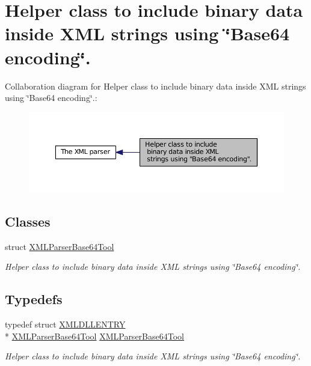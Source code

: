 \hypertarget{group__XMLParserBase64Tool}{\section{Helper class to include binary data inside X\-M\-L strings using \char`\"{}\-Base64 encoding\char`\"{}.}
\label{group__XMLParserBase64Tool}
}
Collaboration diagram for Helper class to include binary data inside X\-M\-L strings using \char`\"{}\-Base64 encoding\char`\"{}.\-:
\nopagebreak
\begin{figure}[H]
\begin{center}
\leavevmode
\includegraphics[width=350pt]{group__XMLParserBase64Tool}
\end{center}
\end{figure}
\subsection*{Classes}
\begin{DoxyCompactItemize}
\item 
struct \hyperlink{structXMLParserBase64Tool}{X\-M\-L\-Parser\-Base64\-Tool}
\begin{DoxyCompactList}\small\item\em Helper class to include binary data inside X\-M\-L strings using \char`\"{}\-Base64 encoding\char`\"{}. \end{DoxyCompactList}\end{DoxyCompactItemize}
\subsection*{Typedefs}
\begin{DoxyCompactItemize}
\item 
typedef struct \hyperlink{xmlParser_8h_a990c86ec1cdbf675604a1a321d852063}{X\-M\-L\-D\-L\-L\-E\-N\-T\-R\-Y} \\*
\hyperlink{structXMLParserBase64Tool}{X\-M\-L\-Parser\-Base64\-Tool} \hyperlink{group__XMLParserBase64Tool_ga90d0646ff4a054f9d8ea0d29fb86f3a9}{X\-M\-L\-Parser\-Base64\-Tool}
\begin{DoxyCompactList}\small\item\em Helper class to include binary data inside X\-M\-L strings using \char`\"{}\-Base64 encoding\char`\"{}. \end{DoxyCompactList}\end{DoxyCompactItemize}


